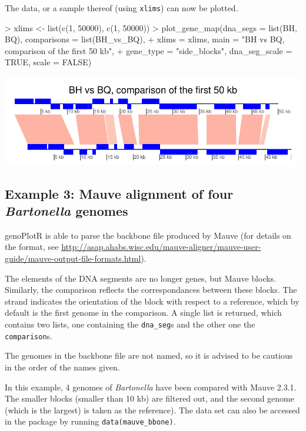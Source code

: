 \documentclass[a4paper]{article}
\newcommand{\code}[1]{\texttt{#1}}
\newcommand{\pkg}[1]{{\normalfont\fontseries{b}\selectfont #1}}
\newcommand{\genoPlotR}{\pkg{genoPlotR}}
\begin{document}
The data, or a sample thereof (using \code{xlims}) can now be plotted.

\begin{Schunk}
\begin{Sinput}
> xlims <- list(c(1, 50000), c(1, 50000))
> plot_gene_map(dna_segs = list(BH, BQ), comparisons = list(BH_vs_BQ), 
+     xlims = xlims, main = "BH vs BQ, comparison of the first 50 kb", 
+     gene_type = "side_blocks", dna_seg_scale = TRUE, scale = FALSE)
\end{Sinput}
\end{Schunk}
\begin{center}
\includegraphics{genoPlotR-025}
\end{center}
\subsection{Example 3: Mauve alignment of four \emph{Bartonella} genomes}

\genoPlotR{} is able to parse the backbone file produced by Mauve (for details
on the format, see \url{http://asap.ahabs.wisc.edu/mauve-aligner/mauve-user-guide/mauve-output-file-formats.html}).

The elements of the DNA segments are no longer genes, but Mauve blocks. 
Similarly, the comparison reflects the correspondances between these blocks. 
The strand indicates the orientation of the block with respect to a reference,
which by default is the first genome in the comparison. A single list is 
returned, which contains two lists, one containing the \code{dna\_seg}s and
the other one the \code{comparison}s.

The genomes in the backbone file are not named, so it is advised to be 
cautious in the order of the names given.

In this example, 4 genomes of \emph{Bartonella} have been compared with 
Mauve 2.3.1. The smaller blocks (smaller than 10 kb) are filtered out, and
the second genome (which is the largest) is taken as the reference). 
The data set can also be accessed in the package by running
\code{data(mauve\_bbone)}. 
\end{document}
